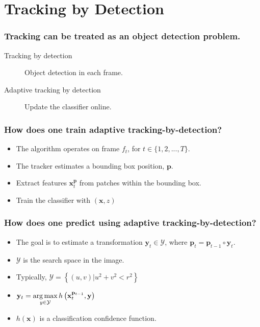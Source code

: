 \section{Tracking by Detection}

\begin{frame}
    \frametitle{Tracking can be treated as an object detection problem.}
    \begin{description}
        \item [Tracking by detection] Object detection in each frame.
        \item [Adaptive tracking by detection] Update the classifier online.
    \end{description}
\end{frame}

\begin{frame}
    \frametitle{How does one train adaptive tracking-by-detection?}
    \begin{itemize}
        \item The algorithm operates on frame \(f_t\), for \(t \in \{1, 2, ..., T\}\).
        \item The tracker estimates a bounding box position, \(\mathbf{p}\).
        \item Extract features \(\mathbf{x}_t^\mathbf{p}\) from patches within the bounding box.
        \item Train the classifier with \((\mathbf{x}, z)\)
    \end{itemize}
\end{frame}

\begin{frame}
    \frametitle{How does one predict using adaptive tracking-by-detection?}
    \begin{itemize}
        \item The goal is to estimate a transformation \(\mathbf{y}_t \in
            \mathcal{Y}\), where \(\mathbf{p}_t = \mathbf{p}_{t-1} \circ \mathbf{y}_t\).
        \item \(\mathcal{Y}\) is the search space in the image.
        \item Typically, \(\mathcal{Y} = \left\{ (u,v) | u^2 + v^2 < r^2 \right \}\)
        \item<3-> \(\mathbf{y}_t = \operatorname*{arg\,max}\limits_{y \in \mathcal{Y}} h \left(
            \mathbf{x}_t^{\mathbf{p}_{t-1}}, \mathbf{y} \right)\)
        \item<3-> \(h(\mathbf{x})\) is a classification confidence function.
    \end{itemize}
\end{frame}

